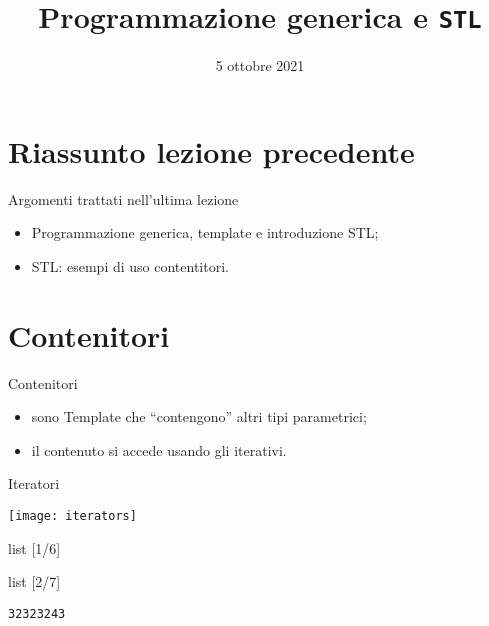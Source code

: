 \documentclass[xcolor={dvipsnames, svgnames, x11names, table}, 10pt]{beamer}
\title{Programmazione generica e \texttt{STL}}
\date{5 ottobre 2021}
\institute{Università degli Studi di Trento}
\begin{document}
\frame{\titlepage}

\section*{Riassunto lezione precedente}

\begin{frame}{Argomenti trattati nell'ultima lezione}

    \begin{itemize}
        \item Programmazione generica, template e introduzione STL;
        \item STL: esempi di uso contentitori.
    \end{itemize}

\end{frame}

\section{Contenitori}

\begin{frame}{Contenitori}

    \begin{itemize}
        \item sono Template che \enquote{contengono} altri tipi parametrici;
        \item il contenuto si accede usando gli iterativi.
    \end{itemize}

\end{frame}

\begin{frame}[c]{Iteratori}

    \texttt{[image: iterators]}

\end{frame}

\begin{frame}[t, fragile]{list [1/6]}


\end{frame}

\begin{frame}[t, fragile]{list [2/7]}

    
    \begin{center}
        \texttt{32323243}
    \end{center}

\end{frame}
\end{document}
